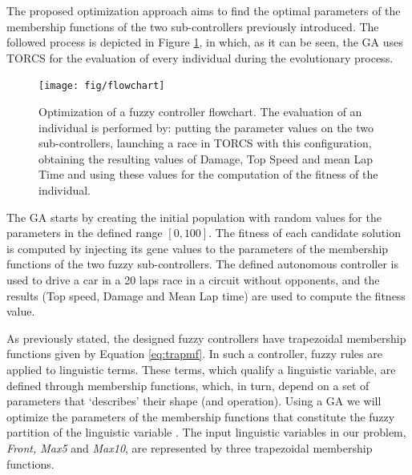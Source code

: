 \documentclass[conference]{IEEEtran}
\begin{document}

The proposed optimization approach aims to find the optimal parameters of the membership functions of the two sub-controllers previously introduced. 
The followed process is depicted in Figure \ref{fig:ga}, in which, as it can be seen, the GA uses TORCS for the evaluation of every individual during the evolutionary process.
\begin{figure}[!ht]
  \label{fig:ga}
  \begin{center}
    \texttt{[image: fig/flowchart]}
  \end{center}
  \caption{Optimization of a fuzzy controller flowchart. The evaluation of an individual is performed by: putting the parameter values on the two sub-controllers, launching a race in TORCS with this configuration, obtaining the resulting values of Damage, Top Speed and mean Lap Time and using these values for the computation of the fitness of the individual.}
\end{figure}	
The GA starts by creating the initial population with random values
for the parameters in the defined range $[0,100]$. The fitness of each
candidate solution is computed by injecting its gene values to the
parameters of the membership functions of the two fuzzy
sub-controllers. The defined autonomous controller is used to drive a
car in a 20 laps race in a circuit without opponents, and the
results (Top speed, Damage and Mean Lap time) are used to compute the
fitness value. 


As previously stated, the designed fuzzy controllers have trapezoidal membership functions given by Equation \ref{eq:trapmf}.
In such a controller, fuzzy rules are applied to linguistic
terms. These terms, which qualify a linguistic variable, are defined
through membership functions, which, in turn, depend on a set of
parameters that `describes' their shape (and operation). Using a GA we
will optimize the parameters of the membership functions that
constitute the fuzzy partition of the linguistic variable
\cite{ThangG08}. The input linguistic variables in our problem,
\textit{Front, Max5} and \textit{Max10}, are represented by three
trapezoidal membership functions. 

\end{document}
